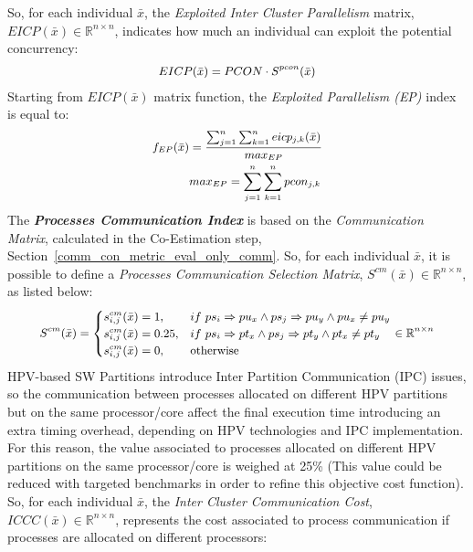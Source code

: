 %
So, for each individual $\bar x$, the \textit{Exploited Inter Cluster Parallelism} matrix, $EICP(\bar x) \in \mathbb{R}^{n \times n}$, indicates how much an individual can exploit the potential concurrency:
%
\begin{equation} \label{eq6}
\small
\begin{aligned}
EICP(\bar x) = PCON \cdot S^{pcon}(\bar x)
\end{aligned}
\end{equation}
%
Starting from $EICP(\bar x)$ matrix function, the \textit{Exploited Parallelism (EP)} index is equal to:
%
\begin{equation} \label{eq7}
\small
\begin{aligned}
f_{EP}(\bar x) &= \frac{\sum^n_{j=1}\sum^n_{k=1}{eicp_{j,k}}(\bar x)}{max_{EP}} \\
&max_{EP} = \sum^n_{j=1}\sum^n_{k=1}pcon_{j,k} 
\end{aligned}
\end{equation}
%
The \textbf{\textit{Processes Communication Index}} \cite{bib24_b}\cite{bib24_c} is based on the \textit{Communication Matrix}, calculated in the Co-Estimation step, Section~\ref{comm_con_metric_eval_only_comm}. So, for each individual $\bar x$, it is possible to define a \textit{Processes Communication Selection Matrix}, $S^{cm}(\bar x) \in \mathbb{R}^{n \times n}$, as listed below:
%
\begin{equation} \label{eq9}
\small
\begin{aligned}
S^{cm}(\bar x) = \begin{cases}
s_{i,j}^{cm}(\bar x) = 1, & if \ ps_{i} \Rightarrow pu_{x} \land ps_{j} \Rightarrow pu_{y} \land pu_{x} \neq pu_{y}\\
s_{i,j}^{cm}(\bar x) = 0.25, & if \ ps_{i} \Rightarrow pt_{x} \land ps_{j} \Rightarrow pt_{y} \land pt_{x} \neq pt_{y}\\
s_{i,j}^{cm}(\bar x) = 0, & \text{otherwise}
\end{cases} \in \mathbb{R}^{n \times n}
\end{aligned}
\end{equation}
%
HPV-based SW Partitions introduce Inter Partition Communication (IPC) issues, so the communication between processes allocated on different HPV partitions but on the same processor/core affect the final execution time introducing an extra timing overhead, depending on HPV technologies and IPC implementation. For this reason, the value associated to processes allocated on different HPV partitions on the same processor/core is weighed at 25\% (This value could be reduced with targeted benchmarks in order to refine this objective cost function). So, for each individual $\bar x$, the \textit{Inter Cluster Communication Cost}, $ICCC(\bar x) \in \mathbb{R}^{n \times n}$, represents the cost associated to process communication if processes are allocated on different processors:
